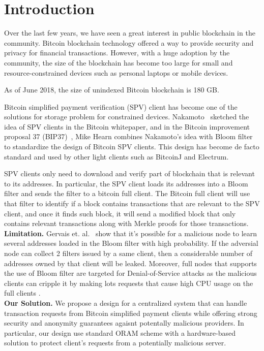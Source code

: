 \section{Introduction}
\label{sec:introduction}
Over the last few years, we have seen a great interest in public blockchain in the community. 
Bitcoin blockchain technology offered a way to provide security and privacy for financial transactions. 
However, with a huge adoption by the community, the size of the blockchain has become too large for small and resource-constrained devices such as personal laptops or mobile devices.
\begin{newtext}
As of June 2018, the size of unindexed Bitcoin blockchain is 180 GB.
\end{newtext} 

Bitcoin simplified payment verification (SPV) client has become one of the solutions for storage problem for constrained devices. 
Nakamoto~\cite{Nakamoto_bitcoin:a} sketched the idea of SPV clients in the Bitcoin whitepaper, 
and in the Bitcoin improvement proposal 37 (BIP37)~\cite{BIP37}, Mike Hearn combines Nakamoto's idea with Bloom filter to standardize the design of Bitcoin SPV clients. 
This design has become de facto standard and used by other light clients such as BitcoinJ and Electrum.

SPV clients only need to download and verify part of blockchain that is relevant to its addresses. 
In particular, the SPV client loads its addresses into a Bloom filter and sends the filter to a bitcoin full client. 
The Bitcoin full client will use that filter to identify if a block contains transactions that are relevant to the SPV client, 
and once it finds such block, it will send a modified block that only contains relevant transactions along with Merkle proofs for those transactions. 
\\
\textbf{Limitation. }
Gervais et. al.~\cite{Gervais:2014:SPV-privacy} show that it's possible for a malicious node to learn several addresses loaded in the Bloom filter with high probability.
If the adversial node can collect 2 filters issued by a same client, then a considerable number of addresses owned by that client will be leaked.
Moreover, full nodes that supports the use of Bloom filter are targeted for Denial-of-Service attacks as the malicious clients can cripple it by making lots requests that cause high CPU usage on the full clients \cite{spv-dos}.
\\
\textbf{Our Solution. }
We propose a design for a centralized system that can handle transaction requests from Bitcoin simplified payment clients while offering strong security and anonymity guarantees agaisnt potentally malicious providers. In particular, our design use standard ORAM scheme with a hardware-based solution to protect client's requests from a potentially malicious server.
\\


